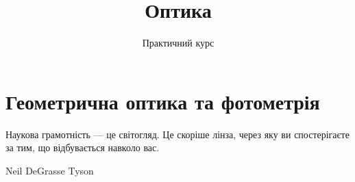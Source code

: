 \documentclass[%
biblatex,%
]{ProblemBook}
\title{Оптика}
\subtitle{Практичний курс}
\begin{document}
\pagestyle{empty}
\CoverPage
{}
\maketitle
\makeinfopage






\clearpage\pagestyle{plain}
\tableofcontents






%






\newcommand{\ChaptersOne}{
	GeomOpt,
	Photometry,
}
\newcommand{\ChaptersTwo}{
	Dispersion,
    Interference,
    Difraction,
    Polarisation,
}

\pagestyle{main}






\part{Геометрична оптика та фотометрія}
\epigraph{\Annabelle  Наукова грамотність --- це світогляд. Це скоріше лінза, через яку ви спостерігаєте за тим, що відбувається навколо вас.}{Neil DeGrasse Tyson}
\end{document}
